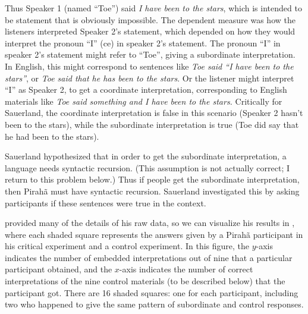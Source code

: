 \documentclass[output=paper]{langscibook}
\begin{document}
Thus Speaker 1 (named ``Toe'') said \textit{I have been to the stars}, which is intended to be
statement that is obviously impossible. The dependent measure was how the listeners interpreted
Speaker 2's statement, which depended on how they would interpret the pronoun ``I'' (ce) in speaker
2’s statement. The pronoun ``I'' in speaker 2’s statement might refer to ``Toe'', giving  a
subordinate interpretation. In English, this might correspond to sentences like \textit{Toe said ``I
  have been to the stars''}, or \textit{Toe said that he has been to the stars}. Or the listener
might interpret ``I'' as Speaker 2, to get a coordinate interpretation, corresponding to English materials like \textit{Toe said something and I have been to the stars.}  Critically for Sauerland, the coordinate interpretation is false in this scenario (Speaker 2 hasn’t been to the stars), while the subordinate interpretation is true (Toe did say that he had been to the stars).

Sauerland hypothesized that in order to get the subordinate interpretation, a language needs syntactic recursion. (This assumption is not actually correct; I return to this problem below.) Thus if people get the subordinate interpretation, then Pirahã must have syntactic recursion. Sauerland investigated this by asking participants if these sentences were true in the context. 

\citet{sauerland2018false} provided many of the details of his raw data, so we can visualize his results in , where each shaded square represents the answers given by a Pirahã participant in his critical experiment and a control experiment. In this figure, the $y$-axis indicates the number of embedded interpretations out of nine that a particular participant obtained, and the $x$-axis indicates the number of correct interpretations of the nine control materials (to be described below) that the participant got. There are 16 shaded squares: one for each participant, including two who happened to give the same pattern of subordinate and control responses.
\end{document}
